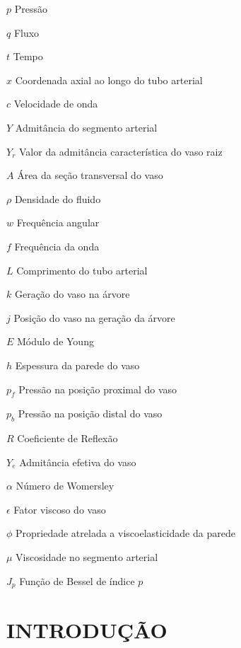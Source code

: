 \documentclass[
        english,			
        brazil			        %
        ,<...>]{abntbibufjf}
\begin{document}
\begin{simbolos} 
\item [$p$] Pressão
\item [$q$] Fluxo
\item [$t$] Tempo
\item [$x$] Coordenada axial ao longo do tubo arterial
\item [$c$] Velocidade de onda
\item [$Y$] Admitância do segmento arterial
\item [$Y_r$] Valor da admitância característica do vaso raiz
\item [$A$] Área da seção transversal do vaso
\item [$\rho$] Densidade do fluido
\item [$w$] Frequência angular
\item [$f$] Frequência da onda
\item [$L$] Comprimento do tubo arterial
\item [$k$] Geração do vaso na árvore
\item [$j$] Posição do vaso na geração da árvore
\item [$E$] Módulo de Young
\item [$h$] Espessura da parede do vaso
\item [$p_f$] Pressão na posição proximal do vaso
\item [$p_b$] Pressão na posição distal do vaso
\item [$R$] Coeficiente de Reflexão
\item [$Y_e$] Admitância efetiva do vaso
\item [$\alpha$] Número de Womersley
\item [$\epsilon$] Fator viscoso do vaso
\item [$\phi$] Propriedade  atrelada a viscoelasticidade da parede
\item [$\mu$] Viscosidade no segmento arterial
\item [$J_p$] Função de Bessel de índice $p$
 \end{simbolos}

 
\tableofcontents*
\cleardoublepage


\textual


\chapter{INTRODUÇÃO}\label{sec:intro}  %
\end{document}
